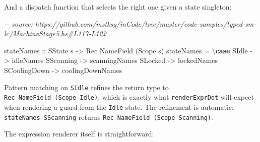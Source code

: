 \documentclass[]{article}
\newenvironment{Shaded}{}{}
\newcommand{\CommentTok}[1]{\textcolor[rgb]{0.38,0.63,0.69}{\textit{#1}}}
\newcommand{\DataTypeTok}[1]{\textcolor[rgb]{0.56,0.13,0.00}{#1}}
\newcommand{\KeywordTok}[1]{\textcolor[rgb]{0.00,0.44,0.13}{\textbf{#1}}}
\newcommand{\NormalTok}[1]{#1}
\newcommand{\OtherTok}[1]{\textcolor[rgb]{0.00,0.44,0.13}{#1}}
\begin{document}
And a dispatch function that selects the right one given a state singleton:

\begin{Shaded}
\begin{Highlighting}[]
\CommentTok{{-}{-} source: https://github.com/mstksg/inCode/tree/master/code{-}samples/typed{-}sm{-}lc/MachineStage5.hs\#L117{-}L122}

\OtherTok{stateNames ::} \DataTypeTok{SState}\NormalTok{ s }\OtherTok{{-}\textgreater{}} \DataTypeTok{Rec} \DataTypeTok{NameField}\NormalTok{ (}\DataTypeTok{Scope}\NormalTok{ s)}
\NormalTok{stateNames }\OtherTok{=}\NormalTok{ \textbackslash{}}\KeywordTok{case}
  \DataTypeTok{SIdle} \OtherTok{{-}\textgreater{}}\NormalTok{ idleNames}
  \DataTypeTok{SScanning} \OtherTok{{-}\textgreater{}}\NormalTok{ scanningNames}
  \DataTypeTok{SLocked} \OtherTok{{-}\textgreater{}}\NormalTok{ lockedNames}
  \DataTypeTok{SCoolingDown} \OtherTok{{-}\textgreater{}}\NormalTok{ coolingDownNames}
\end{Highlighting}
\end{Shaded}

Pattern matching on \texttt{SIdle} refines the return type to
\texttt{Rec\ NameField\ (Scope\ Idle)}, which is exactly what
\texttt{renderExprDot} will expect when rendering a guard from the \texttt{Idle}
state. The refinement is automatic: \texttt{stateNames\ SScanning} returns
\texttt{Rec\ NameField\ (Scope\ Scanning)}.

The expression renderer itself is straightforward:
\end{document}
